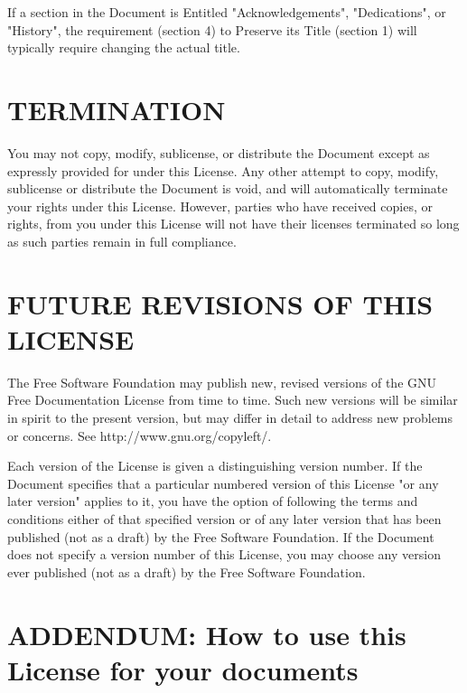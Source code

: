 \documentclass[oneside]{stacks-project-book}
\theoremstyle{plain}
\theoremstyle{definition}
\theoremstyle{remark}
\numberwithin{equation}{subsection}
\begin{document}
If a section in the Document is Entitled "Acknowledgements",
"Dedications", or "History", the requirement (section 4) to Preserve
its Title (section 1) will typically require changing the actual
title.


\section{TERMINATION}
\label{fdl-section-termination}
\hypertarget{05BP}{}
\reversemarginpar{}


You may not copy, modify, sublicense, or distribute the Document except
as expressly provided for under this License.  Any other attempt to
copy, modify, sublicense or distribute the Document is void, and will
automatically terminate your rights under this License.  However,
parties who have received copies, or rights, from you under this
License will not have their licenses terminated so long as such
parties remain in full compliance.


\section{FUTURE REVISIONS OF THIS LICENSE}
\label{fdl-section-future-revisions-of-this-license}
\hypertarget{05BQ}{}
\reversemarginpar{}


The Free Software Foundation may publish new, revised versions
of the GNU Free Documentation License from time to time.  Such new
versions will be similar in spirit to the present version, but may
differ in detail to address new problems or concerns.  See
http://www.gnu.org/copyleft/.

Each version of the License is given a distinguishing version number.
If the Document specifies that a particular numbered version of this
License "or any later version" applies to it, you have the option of
following the terms and conditions either of that specified version or
of any later version that has been published (not as a draft) by the
Free Software Foundation.  If the Document does not specify a version
number of this License, you may choose any version ever published (not
as a draft) by the Free Software Foundation.


\section{ADDENDUM: How to use this License for your documents}
\label{fdl-section-addendum-how-to-use-this-license-for-your-documents}
\hypertarget{05BR}{}
\reversemarginpar{}
\end{document}
